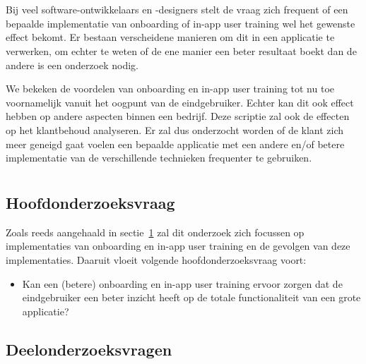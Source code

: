 \section{}
\label{sec:probleemstelling}

Bij veel software-ontwikkelaars en -designers stelt de vraag zich frequent of een bepaalde implementatie van onboarding of in-app user training wel het gewenste effect bekomt. Er bestaan verscheidene manieren om dit in een applicatie te verwerken, om echter te weten of de ene manier een beter resultaat boekt dan de andere is een onderzoek nodig.

We bekeken de voordelen van onboarding en in-app user training tot nu toe voornamelijk vanuit het oogpunt van de eindgebruiker. Echter kan dit ook effect hebben op andere aspecten binnen een bedrijf. Deze scriptie zal ook de effecten op het klantbehoud analyseren. Er zal dus onderzocht worden of de klant zich meer geneigd gaat voelen een bepaalde applicatie met een andere en/of betere implementatie van de verschillende technieken frequenter te gebruiken.

\section{}
\label{sec:onderzoeksvraag}

\subsection{Hoofdonderzoeksvraag}
\label{sec:hoofdonderzoeksvraag}

Zoals reeds aangehaald in sectie~\ref{sec:probleemstelling} zal dit onderzoek zich focussen op implementaties van onboarding en in-app user training en de gevolgen van deze implementaties. Daaruit vloeit volgende hoofdonderzoeksvraag voort:

\begin{itemize}
    \item Kan een (betere) onboarding en in-app user training ervoor zorgen dat de eindgebruiker een beter inzicht heeft op de totale functionaliteit van een grote applicatie?
\end{itemize}

\subsection{Deelonderzoeksvragen}
\label{sec:deelonderzoeksvragen}

